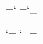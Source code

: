 



\let\DeclareTextSymbol\undefined




\ifx \CatEscape\undefined
    \chardef{}
    \chardef{}
    \chardef{}
    \chardef{}
    \chardef{}
    \chardef{}
    \chardef{}               %
    \chardef{}

    \chardef\CatAtCode=\catcode`\@
    \chardef\CatUsCode=\catcode`\_
\fi

\catcode`\@=\CatLetter                  %
\catcode`\_=\CatLetter


